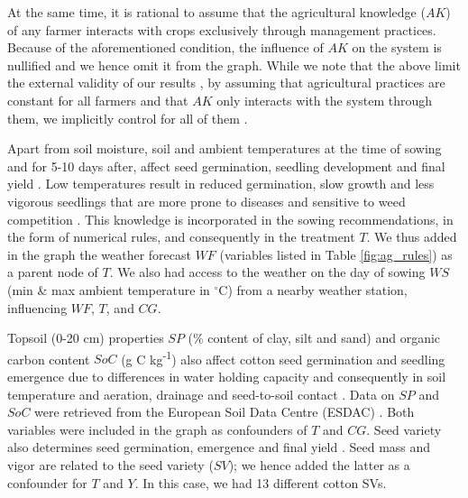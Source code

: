 \documentclass[letterpaper]{article} %
\begin{document}
At the same time, it is rational to assume that the agricultural knowledge ($AK$) of any farmer interacts with crops exclusively through management practices. Because of the aforementioned condition, the influence of $AK$ on the system is nullified and we hence omit it from the graph. While we note that the above limit the external validity of our results \cite{calder1982concept}, by assuming that agricultural practices are constant for all farmers and that $AK$ only interacts with the system through them, we implicitly control for all of them \cite{huntington2021effect}.


Apart from soil moisture, soil and ambient temperatures at the time of sowing and for 5-10 days after, affect seed germination, seedling development and final yield \cite{virk2019physiological,boman2005soil,varcosoil}.
Low temperatures result in reduced germination, slow growth and less vigorous
seedlings that are more prone to diseases and sensitive to weed competition \cite{wanjura1969emergence,bradow2010germination}. This knowledge is incorporated in the sowing recommendations, in the form of numerical rules, and consequently in the treatment $T$. We thus added in the graph the weather forecast $WF$ (variables listed in Table \ref{fig:ag_rules}) as a parent node of $T$. We also had access to the weather on the day of sowing $WS$ (min \& max ambient temperature in $^\circ$C) from a nearby weather station, influencing $WF$, $T$, and $CG$.


Topsoil (0-20 cm) properties $SP$ (\% content of clay, silt and sand) and organic carbon content  $SoC$ (g C kg\textsuperscript{-1}) also affect cotton seed germination and seedling emergence due to differences in water holding capacity and consequently in soil temperature and aeration, drainage and seed-to-soil contact \cite{varcosoil}. Data on $SP$ and $SoC$ were retrieved from the European Soil Data Centre (ESDAC) \cite{ballabio2016mapping, de2015map}. Both variables were included in the graph as confounders of $T$ and $CG$.
Seed variety also determines seed germination, emergence and final yield \cite{sniderseed}.
Seed mass and vigor \cite{liu2015early,sniderseed} are related to the seed variety ($SV$); we hence added the latter as a confounder for $T$ and $Y$. In this case, we had 13 different cotton SVs.
\end{document}
